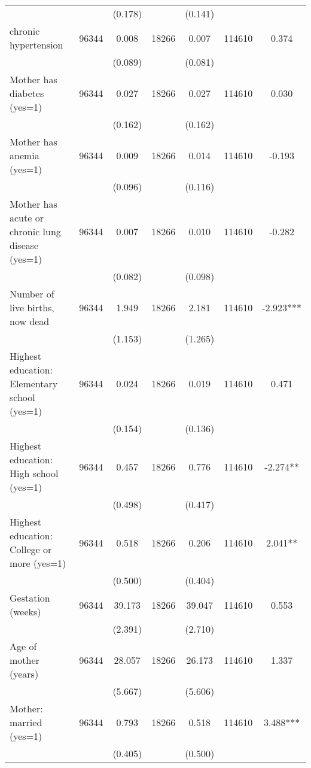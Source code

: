 \begin{tabular}{@{\extracolsep{5pt}}lcccccc}
 &   & (0.178)  &   & (0.141)  &   &  \\ [1ex]
chronic hypertension   & 96344    & 0.008    & 18266    & 0.007    & 114610    & 0.374   \\
 &   & (0.089)  &   & (0.081)  &   &  \\ [1ex]
Mother has diabetes (yes=1)   & 96344    & 0.027    & 18266    & 0.027    & 114610    & 0.030   \\
 &   & (0.162)  &   & (0.162)  &   &  \\ [1ex]
Mother has anemia (yes=1)   & 96344    & 0.009    & 18266    & 0.014    & 114610    & -0.193   \\
 &   & (0.096)  &   & (0.116)  &   &  \\ [1ex]
Mother has acute or chronic lung disease (yes=1)   & 96344    & 0.007    & 18266    & 0.010    & 114610    & -0.282   \\
 &   & (0.082)  &   & (0.098)  &   &  \\ [1ex]
Number of live births, now dead   & 96344    & 1.949    & 18266    & 2.181    & 114610    & -2.923***   \\
 &   & (1.153)  &   & (1.265)  &   &  \\ [1ex]
Highest education: Elementary school (yes=1)   & 96344    & 0.024    & 18266    & 0.019    & 114610    & 0.471   \\
 &   & (0.154)  &   & (0.136)  &   &  \\ [1ex]
Highest education: High school (yes=1)   & 96344    & 0.457    & 18266    & 0.776    & 114610    & -2.274**   \\
 &   & (0.498)  &   & (0.417)  &   &  \\ [1ex]
Highest education: College or more (yes=1)   & 96344    & 0.518    & 18266    & 0.206    & 114610    & 2.041**   \\
 &   & (0.500)  &   & (0.404)  &   &  \\ [1ex]
Gestation (weeks)   & 96344    & 39.173    & 18266    & 39.047    & 114610    & 0.553   \\
 &   & (2.391)  &   & (2.710)  &   &  \\ [1ex]
Age of mother (years)   & 96344    & 28.057    & 18266    & 26.173    & 114610    & 1.337   \\
 &   & (5.667)  &   & (5.606)  &   &  \\ [1ex]
Mother: married (yes=1)   & 96344    & 0.793    & 18266    & 0.518    & 114610    & 3.488***   \\
 &   & (0.405)  &   & (0.500)  &   &  \\ [1ex]

\end{tabular}
